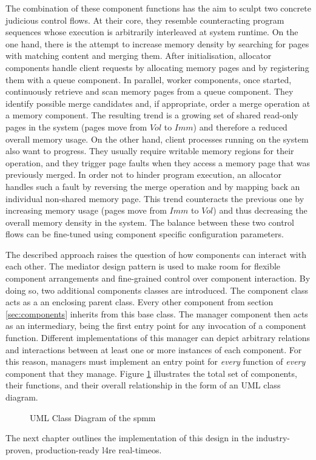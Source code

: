 The combination of these component functions has the aim to sculpt two concrete judicious control flows.
At their core, they resemble counteracting program sequences whose execution is arbitrarily interleaved at system runtime.
On the one hand, there is the attempt to increase memory density by searching for pages with matching content and merging them.
After initialisation, allocator components handle client requests by allocating memory pages and by registering them with a queue component.
In parallel, worker components, once started, continuously retrieve and scan memory pages from a queue component.
They identify possible merge candidates and, if appropriate, order a merge operation at a memory component.
The resulting trend is a growing set of shared read-only pages in the system (pages move from $Vol$ to $Imm$) and therefore a reduced overall memory usage.
On the other hand, client processes running on the system also want to progress.
They usually require writable memory regions for their operation, and they trigger page faults when they access a memory page that was previously merged.
In order not to hinder program execution, an allocator handles such a fault by reversing the merge operation and by mapping back an individual non-shared memory page.
This trend counteracts the previous one by increasing memory usage (pages move from $Imm$ to $Vol$) and thus decreasing the overall memory density in the system.
The balance between these two control flows can be fine-tuned using component specific configuration parameters.

The described approach raises the question of how components can interact with each other.
The mediator design pattern is used to make room for flexible component arrangements and fine-grained control over component interaction.
By doing so, two additional components classes are introduced.
The component class acts as a an enclosing parent class.
Every other component from section \ref{sec:components} inherits from this base class.
The manager component then acts as an intermediary, being the first entry point for any invocation of a component function.
Different implementations of this manager can depict arbitrary relations and interactions between at least one or more instances of each component.
For this reason, managers must implement an entry point for \emph{every} function of \emph{every} component that they manage.
Figure \ref{fig:umlcd} illustrates the total set of components, their functions, and their overall relationship in the form of an UML class diagram.

\begin{figure}
  \centering
  
  \caption{UML Class Diagram of the \acs{spmm}}
  \label{fig:umlcd}
\end{figure}

The next chapter outlines the implementation of this design in the industry-proven, production-ready \ac{l4re} real-time\ac{os}.
